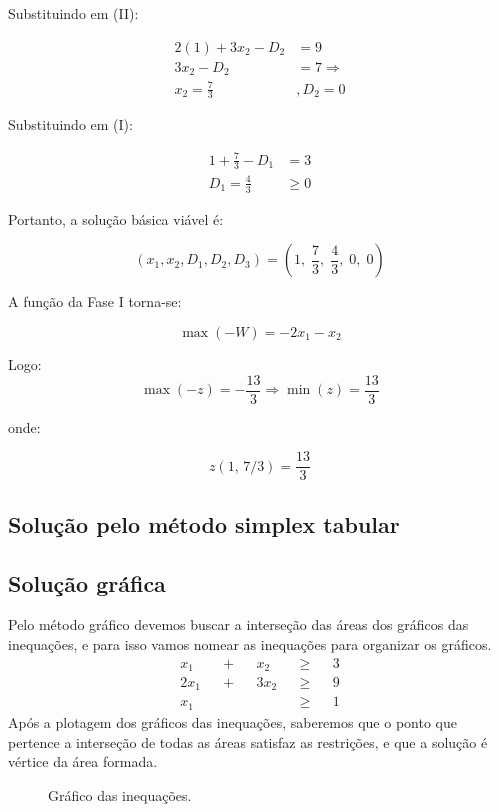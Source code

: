 \documentclass[12pt, a4paper]{article}
\begin{document}
Substituindo em (II):

\begin{align*}
  2(1) + 3x_2 - D_2 &= 9\\
  3x_2 - D_2 &= 7 \Rightarrow \\
  x_2 = \frac{7}{3}&,  D_2 = 0
\end{align*}

Substituindo em (I):

\begin{align*}
1 + \frac{7}{3} - D_1 &= 3 \\
D_1 = \frac{4}{3} &\ge 0
\end{align*}

Portanto, a solução básica viável é:

\[
(x_1, x_2, D_1, D_2, D_3) = \left(1,\; \frac{7}{3},\; \frac{4}{3},\; 0,\; 0\right)
\]

A função da Fase I torna-se:

\[
\max(-W) = -2x_1 - x_2
\]

Logo:
\[
\max(-z) = -\frac{13}{3}
\Rightarrow
\min(z) = \frac{13}{3}
\]

onde:

\[
z(1,\, 7/3) = \frac{13}{3}
\]
\cleardoublepage

\subsection[Método simplex tabular]{Solução pelo método simplex tabular}
\cleardoublepage
\subsection[Método gráfico]{Solução gráfica}
Pelo método gráfico devemos buscar a interseção das áreas dos gráficos das inequações, e para isso vamos nomear as inequações para organizar os gráficos.
\begin{align*}
  x_1 &&+&& x_2&&\ge&& 3 \tag{a}\\
  2x_1 &&+&& 3x_2&&\ge&& 9 \tag{b}\\
  x_1 &&&& &&\ge&& 1 \tag{c}
\end{align*}
Após a plotagem dos gráficos das inequações, saberemos que o ponto que pertence a interseção de todas as áreas satisfaz as restrições, e que a solução é vértice da área formada.

\begin{figure}[h!]
  \centering
  \scalebox{0.9}{}
  \caption{Gráfico das inequações.}
  \label{fig:exemplo}
\end{figure}
\cleardoublepage
\end{document}
